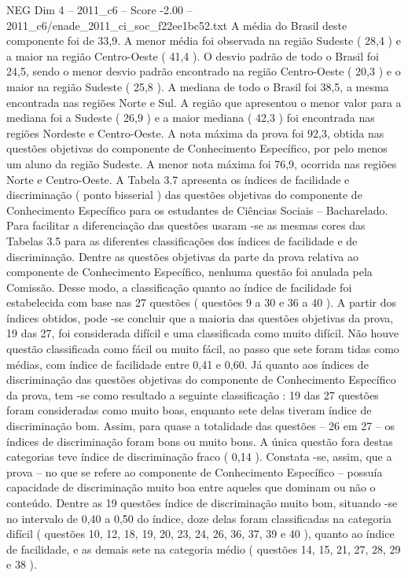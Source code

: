 \begin{textsample}{NEG Dim 4 – 2011\_c6 – Score -2.00 – 2011\_c6/enade\_2011\_ci\_soc\_f22ee1bc52.txt}
A média do Brasil deste componente foi de 33,9.
A menor média foi observada na região Sudeste ( 28,4 ) e a maior na região Centro-Oeste ( 41,4 ).
O desvio padrão de todo o Brasil foi 24,5, sendo o menor desvio padrão encontrado na região Centro-Oeste ( 20,3 ) e o maior na região Sudeste ( 25,8 ).
A mediana de todo o Brasil foi 38,5, a mesma encontrada nas regiões Norte e Sul.
A região que apresentou o menor valor para a mediana foi a Sudeste ( 26,9 ) e a maior mediana ( 42,3 ) foi encontrada nas regiões Nordeste e Centro-Oeste.
A nota máxima da prova foi 92,3, obtida nas questões objetivas do componente de Conhecimento Específico, por pelo menos um aluno da região Sudeste.
A menor nota máxima foi 76,9, ocorrida nas regiões Norte e Centro-Oeste.
A Tabela 3.7 apresenta os índices de facilidade e discriminação ( ponto bisserial ) das questões objetivas do componente de Conhecimento Específico para os estudantes de Ciências Sociais – Bacharelado.
Para facilitar a diferenciação das questões usaram -se as mesmas cores das Tabelas 3.5 para as diferentes classificações dos índices de facilidade e de discriminação.
Dentre as questões objetivas da parte da prova relativa ao componente de Conhecimento Específico, nenhuma questão foi anulada pela Comissão.
Desse modo, a classificação quanto ao índice de facilidade foi estabelecida com base nas 27 questões ( questões 9 a 30 e 36 a 40 ).
A partir dos índices obtidos, pode -se concluir que a maioria das questões objetivas da prova, 19 das 27, foi considerada difícil e uma classificada como muito difícil.
Não houve questão classificada como fácil ou muito fácil, ao passo que sete foram tidas como médias, com índice de facilidade entre 0,41 e 0,60.
Já quanto aos índices de discriminação das questões objetivas do componente de Conhecimento Específico da prova, tem -se como resultado a seguinte classificação : 19 das 27 questões foram consideradas como muito boas, enquanto sete delas tiveram índice de discriminação bom.
Assim, para quase a totalidade das questões – 26 em 27 – os índices de discriminação foram bons ou muito bons.
A única questão fora destas categorias teve índice de discriminação fraco ( 0,14 ).
Constata -se, assim, que a prova – no que se refere ao componente de Conhecimento Específico – possuía capacidade de discriminação muito boa entre aqueles que dominam ou não o conteúdo.
Dentre as 19 questões índice de discriminação muito bom, situando -se no intervalo de 0,40 a 0,50 do índice, doze delas foram classificadas na categoria difícil ( questões 10, 12, 18, 19, 20, 23, 24, 26, 36, 37, 39 e 40 ), quanto ao índice de facilidade, e as demais sete na categoria médio ( questões 14, 15, 21, 27, 28, 29 e 38 ).

\end{textsample}
